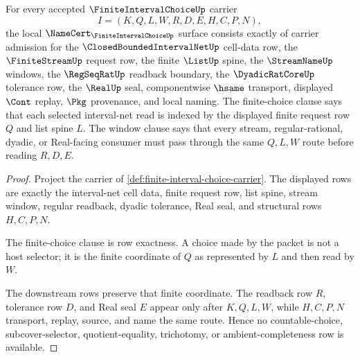\begin{theorem}
\label{thm:finite-interval-choice-namecert-obligations}
For every accepted $\FiniteIntervalChoiceUp$ carrier
$$
I=(K,Q,L,W,R,D,E,H,C,P,N),
$$
the local $\NameCert_{\FiniteIntervalChoiceUp}$ surface consists exactly of carrier admission for the $\ClosedBoundedIntervalNetUp$ cell-data row, the $\FiniteStreamUp$ request row, the finite $\ListUp$ spine, the $\StreamNameUp$ windows, the $\RegSeqRatUp$ readback boundary, the $\DyadicRatCoreUp$ tolerance row, the $\RealUp$ seal, componentwise $\hsame$ transport, displayed $\Cont$ replay, $\Pkg$ provenance, and local naming. The finite-choice clause says that each selected interval-net read is indexed by the displayed finite request row $Q$ and list spine $L$. The window clause says that every stream, regular-rational, dyadic, or Real-facing consumer must pass through the same $Q,L,W$ route before reading $R,D,E$.
\end{theorem}
\begin{proof}
Project the carrier of \autoref{def:finite-interval-choice-carrier}. The displayed rows are exactly the interval-net cell data, finite request row, list spine, stream window, regular readback, dyadic tolerance, Real seal, and structural rows $H,C,P,N$.

The finite-choice clause is row exactness. A choice made by the packet is not a host selector; it is the finite coordinate of $Q$ as represented by $L$ and then read by $W$.

The downstream rows preserve that finite coordinate. The readback row $R$, tolerance row $D$, and Real seal $E$ appear only after $K,Q,L,W$, while $H,C,P,N$ transport, replay, source, and name the same route. Hence no countable-choice, subcover-selector, quotient-equality, trichotomy, or ambient-completeness row is available.
\end{proof}

